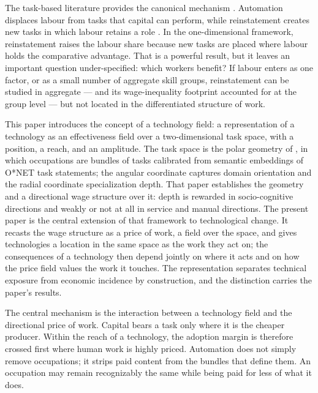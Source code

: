 \documentclass[12pt, a4paper]{article}
\begin{document}
The task-based literature provides the canonical mechanism
\parencite{acemoglu2011skills}. Automation
displaces labour from tasks that capital can perform, while
reinstatement creates new tasks in which labour retains a role
\parencite{acemoglu2018race,acemoglu2019automation}. In the
one-dimensional framework, reinstatement raises the labour share because
new tasks are placed where labour holds the comparative advantage. That
is a powerful result, but it leaves an important question under-specified:
which workers benefit? If labour enters as one factor, or as a small
number of aggregate skill groups, reinstatement can be studied in
aggregate --- and its wage-inequality footprint accounted for at the
group level \parencite{acemoglu2022tasks} --- but not located in the
differentiated structure of work.

This paper introduces the concept of a technology field: a
representation of a technology as an effectiveness field over a
two-dimensional task space, with a position, a reach, and an
amplitude. The task space is the polar geometry of
\textcite{storck2026geometry}, in which occupations are bundles of
tasks calibrated from semantic embeddings of O*NET task statements;
the angular coordinate captures domain orientation and the radial
coordinate specialization depth. That paper establishes the geometry
and a directional wage structure over it: depth is rewarded in
socio-cognitive directions and weakly or not at all in service and
manual directions. The present paper is the central extension of that
framework to technological change. It recasts the wage structure as a
price of work, a field over the space, and gives technologies a
location in the same space as the work they act on; the consequences
of a technology then depend jointly on where it acts and on how the
price field values the work it touches. The
representation separates technical exposure from economic incidence by
construction, and the distinction carries the paper's results.

The central mechanism is the interaction between a technology field and
the directional price of work. Capital bears a task only where it is the
cheaper producer. Within the reach of a technology, the adoption margin
is therefore crossed first where human work is highly priced. Automation
does not simply remove occupations; it strips paid content from the
bundles that define them. An occupation may remain recognizably the
same while being paid for less of what it does.
\end{document}
